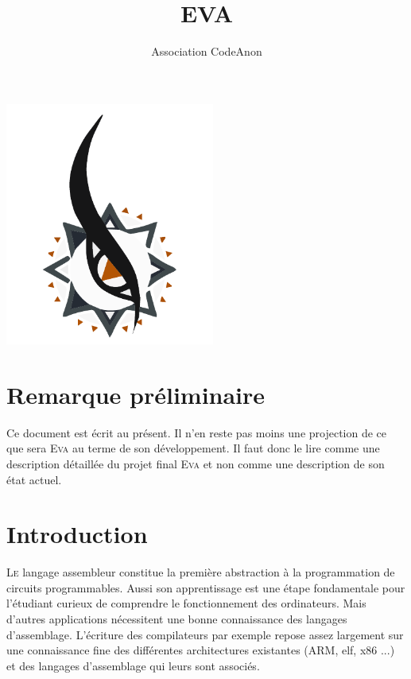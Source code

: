 \documentclass[11pt,twoside]{article}
\newcommand{\noun}[1]{\textsc{#1}}
\begin{document}
\title{EVA}
\author{Association CodeAnon}

\maketitle
\clearpage{}
\vfill
\begin{center}
  \includegraphics[height=8cm]{logo_graph.pdf}
\end{center}
\vfill
\cleardoublepage

\hspace{0pt}
\vfill

\section*{Remarque préliminaire}

Ce document est écrit au présent. Il n'en reste pas moins une projection de ce que sera \noun{Eva} au terme de son développement. Il faut donc le lire comme une description détaillée du projet final \noun{Eva} et non comme une description de son état actuel.

\vfill
\hspace{0pt}

\clearpage

\tableofcontents
\cleardoublepage

\hspace{0pt}
\vfill

\section{Introduction}

\lettrine[lines=3,slope=.3em]%
{L}{e} langage assembleur constitue la première abstraction à la programmation
de circuits programmables. Aussi son apprentissage est une étape fondamentale pour l'étudiant curieux de comprendre le fonctionnement des ordinateurs. Mais d'autres applications nécessitent une bonne connaissance des langages d'assemblage. L'écriture des compilateurs par exemple repose assez largement sur une connaissance fine des différentes architectures existantes (ARM, elf, x86 ...) et des langages d'assemblage qui leurs sont associés.
\end{document}
